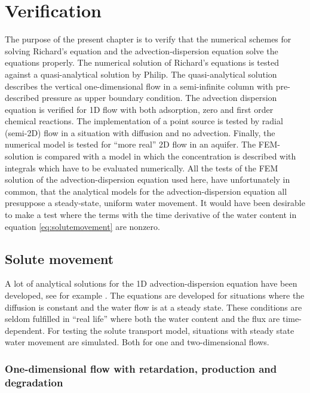 \chapter{Verification}

The purpose of the present chapter is to verify that the numerical
schemes for solving Richard's equation and the advection-dispersion
equation solve the equations properly. The numerical solution of
Richard's equations is tested against a quasi-analytical solution by
Philip. The quasi-analytical solution describes the vertical
one-dimensional flow in a semi-infinite column with pre-described
pressure as upper boundary condition. The advection dispersion
equation is verified for 1D flow with both adsorption, zero and
first order chemical reactions. The implementation of a point source is
tested by radial (semi-2D) flow in a situation with diffusion and
no advection. Finally, the numerical model is tested for ``more
real'' 2D flow in an aquifer. The FEM-solution is compared with a
model in which the concentration is described with integrals which
have to be evaluated numerically. All the tests of the FEM solution of
the advection-dispersion equation used here, have unfortunately in
common, that the analytical models for the advection-dispersion
equation all presuppose a steady-state, uniform water movement. It
would have been desirable to make a test where the terms with the time
derivative of the water content in equation \ref{eq:solutemovement}
are nonzero.



\section{Solute movement}

A lot of analytical solutions for the 1D advection-dispersion equation
have been developed, see for example \cite{Genuchtenanalytical}. The
equations are developed for situations where the diffusion is constant
and the water flow is at a steady state. These conditions are seldom
fulfilled in ``real life'' where both the water content and the flux
are time-dependent. For testing the solute transport model, situations
with steady state water movement are simulated. Both for one and
two-dimensional flows.



\subsection{One-dimensional flow with retardation, production and
  degradation}

